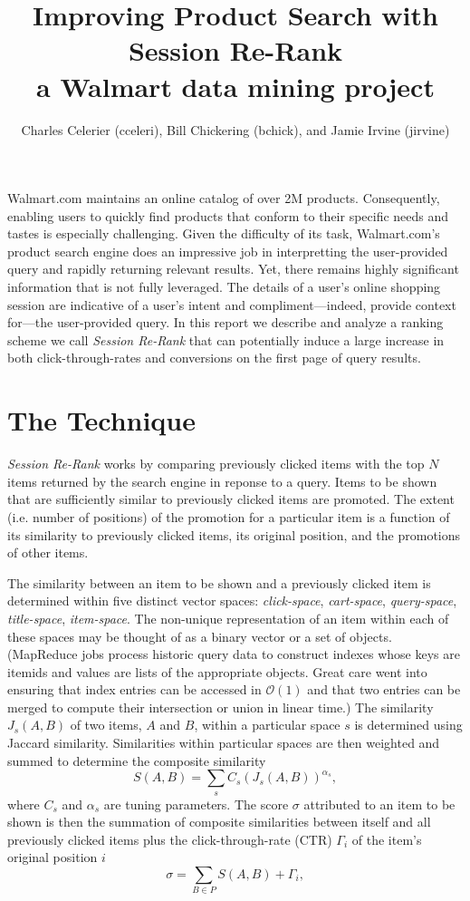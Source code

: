 \documentclass{article}
\title{Improving Product Search with Session Re-Rank\\
    \large{a Walmart data mining project}}
\author{Charles Celerier (cceleri), Bill Chickering (bchick),
        and Jamie Irvine (jirvine)}
\begin{document}
\maketitle

Walmart.com maintains an online catalog of over 2M products. Consequently,
enabling users to quickly find products that conform to their specific needs and
tastes is especially challenging. Given the difficulty of its task,
Walmart.com's product search engine does an impressive job in interpretting the
user-provided query and rapidly returning relevant results. Yet, there remains
highly significant information that is not fully leveraged. The details of a
user's online shopping session are indicative of a user's intent and
compliment---indeed, provide context for---the user-provided query. In this report
we describe and analyze a ranking scheme we call {\em Session Re-Rank} that can
potentially induce a large increase in both click-through-rates and conversions
on the first page of query results.

\section{The Technique}

{\em Session Re-Rank} works by comparing previously clicked items with the top
$N$ items returned by the search engine in reponse to a query. Items to be shown
that are sufficiently similar to previously clicked items are promoted. The
extent (i.e. number of positions) of the promotion for a particular item is a
function of its similarity to previously clicked items, its original position,
and the promotions of other items.

The similarity between an item to be shown and a previously clicked item is
determined within five distinct vector spaces: {\em click-space}, {\em
cart-space}, {\em query-space}, {\em title-space}, {\em item-space}. The
non-unique representation of an item within each of these spaces may be thought
of as a binary vector or a set of objects. (MapReduce jobs process historic
query data to construct indexes whose keys are itemids and values are lists of
the appropriate objects. Great care went into ensuring that index entries can be
accessed in $\mathcal{O}(1)$ and that two entries can be merged to compute their
intersection or union in linear time.) The similarity $J_s(A, B)$ of two items,
$A$ and $B$, within a particular space $s$ is determined using Jaccard
similarity. Similarities within particular spaces are then weighted and summed
to determine the composite similarity
\begin{equation*}
    S(A, B) = \sum_s{C_s(J_s(A, B))^{\alpha_s}},
\end{equation*}
where $C_s$ and $\alpha_s$ are tuning parameters. The score $\sigma$ attributed
to an item to be shown is then the summation of composite similarities between
itself and all previously clicked items plus the click-through-rate (CTR)
$\Gamma_i$ of the item's original position $i$
\begin{equation*}
    \sigma = \sum_{B \in P}{S(A, B)} + \Gamma_i,
\end{equation*}
\end{document}
